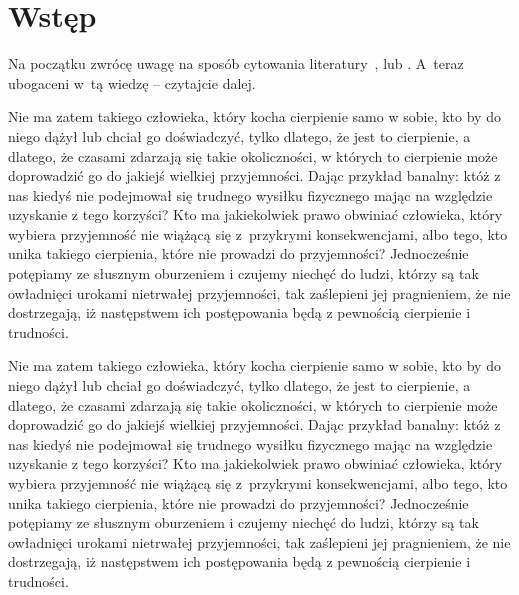 \documentclass[12pt]{mwbk}
\theoremstyle{plain}
\theoremstyle{definition}
\theoremstyle{remark}
\begin{document}



\tableofcontents


\chapter*{Wstęp}



Na początku zwrócę uwagę na sposób cytowania
literatury~\cite{Krawczyk93}, lub \cite{Gollmann1989,Meier1994}. A~teraz
ubogaceni w~tą wiedzę -- czytajcie dalej.



Nie ma zatem takiego człowieka, który kocha cierpienie samo w sobie, 
kto by do niego dążył lub chciał go doświadczyć, tylko dlatego, że
jest to cierpienie, a dlatego, że czasami zdarzają się takie 
okoliczności, w których to cierpienie może doprowadzić 
go do jakiejś wielkiej przyjemności. 
Dając przykład banalny: któż z nas kiedyś nie podejmował 
się trudnego wysiłku fizycznego mając na względzie 
uzyskanie z tego korzyści? 
Kto ma jakiekolwiek prawo obwiniać człowieka, 
który wybiera przyjemność nie wiążącą się z~przykrymi 
konsekwencjami, albo tego, kto unika takiego cierpienia, 
które nie prowadzi do przyjemności? 
Jednocześnie potępiamy ze słusznym oburzeniem i czujemy 
niechęć do ludzi, którzy są tak owładnięci urokami nietrwałej 
przyjemności, tak zaślepieni jej pragnieniem, 
że nie dostrzegają, iż następstwem ich 
postępowania będą z pewnością cierpienie i trudności.












Nie ma zatem takiego człowieka, który kocha cierpienie samo w sobie, 
kto by do niego dążył lub chciał go doświadczyć, tylko dlatego, że
jest to cierpienie, a dlatego, że czasami zdarzają się takie 
okoliczności, w których to cierpienie może doprowadzić 
go do jakiejś wielkiej przyjemności. 
Dając przykład banalny: któż z nas kiedyś nie podejmował 
się trudnego wysiłku fizycznego mając na względzie 
uzyskanie z tego korzyści? 
Kto ma jakiekolwiek prawo obwiniać człowieka, 
który wybiera przyjemność nie wiążącą się z~przykrymi 
konsekwencjami, albo tego, kto unika takiego cierpienia, 
które nie prowadzi do przyjemności? 
Jednocześnie potępiamy ze słusznym oburzeniem i czujemy 
niechęć do ludzi, którzy są tak owładnięci urokami nietrwałej 
przyjemności, tak zaślepieni jej pragnieniem, 
że nie dostrzegają, iż następstwem ich 
postępowania będą z pewnością cierpienie i trudności.
\end{document}
